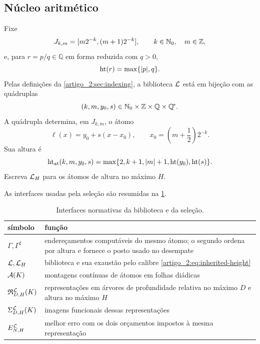\subsection{Núcleo aritmético}

Fixe
\[
 J_{k,m}=[m2^{-k},(m+1)2^{-k}],
 \qquad k\in\mathbb{N}_0,\quad m\in\mathbb Z,
\]
e, para $r=p/q\in\mathbb Q$ em forma reduzida com $q>0$,
\[
 \operatorname{ht}(r)=\max\{|p|,q\}.
\]
Pelas definições da \cref{artigo_2:sec:indexing}, a biblioteca $\mathcal{L}$ está em bijeção com as
quádruplas
\[
 (k,m,y_0,s)\in\mathbb{N}_0\times\mathbb Z\times\mathbb Q\times\mathbb{Q}^{\!*}.
\]
A quádrupla determina, em $J_{k,m}$, o átomo
\begin{equation}
 \ell(x)=y_0+s(x-x_0),
 \qquad x_0=\left(m+\frac12\right)2^{-k}.
 \label{artigo_2:eq:inherited-atom}
\end{equation}
Sua altura é
\begin{equation}
 \operatorname{ht}_{\rm at}(k,m,y_0,s)
 =\max\{2,k+1,|m|+1,\operatorname{ht}(y_0),\operatorname{ht}(s)\}.
 \label{artigo_2:eq:inherited-height}
\end{equation}
Escreva $\mathcal{L}_H$ para os átomos de altura no máximo $H$.

As interfaces usadas pela seleção são resumidas na
\cref{artigo_2:tab:interfaces}.
\begin{table}[t]
 \centering
 \caption{Interfaces normativas da biblioteca e da seleção.}
 \label{artigo_2:tab:interfaces}
 \small
 \begin{tabularx}{\linewidth}{@{}lX@{}}
  \toprule
  símbolo & função\\
  \midrule
  $\Gamma,\Gamma^\sharp$ & endereçamentos computáveis do mesmo átomo; o
  segundo ordena por altura e fornece o posto usado no desempate\\
  $\mathcal{L},\mathcal{L}_H$ & biblioteca e sua exaustão pelo calibre
  \eqref{artigo_2:eq:inherited-height}\\
  $\mathcal{A}(K)$ & montagens contínuas de átomos em folhas diádicas\\
  $\mathfrak{R}_{D,H}^{\mathcal{L}}(K)$ & representações em árvores de
  profundidade relativa no máximo $D$ e altura no máximo $H$\\
  $\Sigma_{D,H}^{\mathcal{L}}(K)$ & imagens funcionais dessas representações\\
  $E_{N,H}^{\mathcal{L}}$ & melhor erro com os dois orçamentos impostos à mesma
  representação\\
  \bottomrule
 \end{tabularx}
\end{table}

